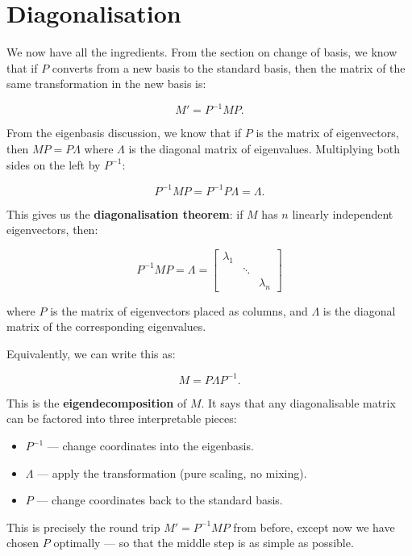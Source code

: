\documentclass[11pt,openany]{book}
\theoremstyle{definition}
\begin{document}
\section{Diagonalisation}

We now have all the ingredients. From the section on change of basis, we know that 
if $P$ converts from a new basis to the standard basis, then the matrix of the same 
transformation in the new basis is:

\[
M' = P^{-1}MP.
\]

From the eigenbasis discussion, we know that if $P$ is the matrix of eigenvectors, 
then $MP = P\Lambda$ where $\Lambda$ is the diagonal matrix of eigenvalues. 
Multiplying both sides on the left by $P^{-1}$:

\[
P^{-1}MP = P^{-1}P\Lambda = \Lambda.
\]

This gives us the \textbf{diagonalisation theorem}: if $M$ has $n$ linearly 
independent eigenvectors, then:

\[
\boxed{P^{-1}MP = \Lambda = 
\begin{bmatrix} \lambda_1 & & \\ & \ddots & \\ & & \lambda_n \end{bmatrix}}
\]

where $P$ is the matrix of eigenvectors placed as columns, and $\Lambda$ is the 
diagonal matrix of the corresponding eigenvalues.

\medskip

Equivalently, we can write this as:

\[
M = P \Lambda P^{-1}.
\]

This is the \textbf{eigendecomposition} of $M$. It says that any diagonalisable 
matrix can be factored into three interpretable pieces:

\begin{itemize}
  \item $P^{-1}$ --- change coordinates into the eigenbasis.
  \item $\Lambda$ --- apply the transformation (pure scaling, no mixing).
  \item $P$ --- change coordinates back to the standard basis.
\end{itemize}

This is precisely the round trip $M' = P^{-1}MP$ from before, except now we have 
chosen $P$ optimally --- so that the middle step is as simple as possible.
\end{document}
